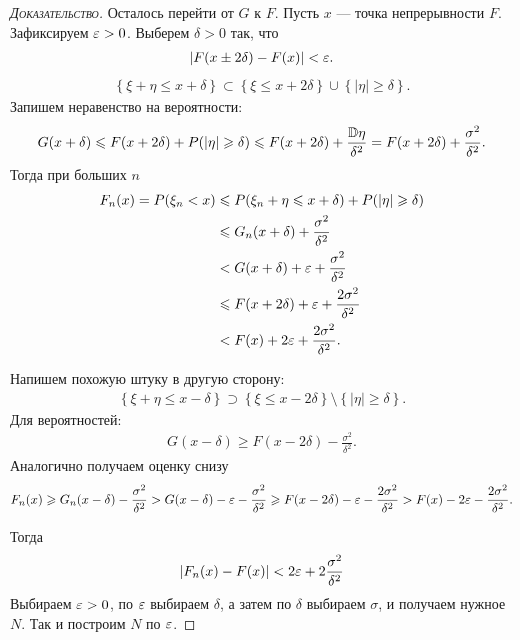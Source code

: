 \documentclass[../main.tex]{subfiles}
\begin{document}
\begin{proof}[\normalfont\textsc{Доказательство}]
 Осталось перейти от $ G $ к $ F $. Пусть $ x $ --- точка непрерывности $ F $. Зафиксируем $ \varepsilon  > 0 $. Выберем $ \delta > 0 $ так, что 
 \begin{align*}
  \left| F(x \pm 2\delta) - F(x) \right| < \varepsilon.
 \end{align*}
 \begin{align*}
  \left\{ \xi+\eta \leqslant x  + \delta \right\} \subset \left\{ \xi \leqslant x + 2\delta \right\} \cup \left\{ \left| \eta \right| \geqslant \delta \right\}.
 \end{align*} Запишем неравенство на вероятности:
 \begin{align*}
	 G(x+\delta) \leqslant F(x+2\delta) + P(\left| \eta \right| \geqslant \delta) \leqslant F(x+2\delta) + \frac{\mathbb D \eta}{\delta^{2}} = F(x + 2\delta) + \frac{\sigma^2}{\delta^2}. 
 \end{align*} 
 Тогда при больших $n$
 \begin{align*}
	 F_n(x) = P(\xi_n < x) &\leqslant P(\xi_n + \eta \leqslant x + \delta) + P(|\eta| \geqslant \delta) \\
												 &\leqslant G_n(x+\delta) + \frac{\sigma^{2}}{\delta^{2}} \\
												 &< G(x+\delta) + \varepsilon + \frac{\sigma^{2}}{\delta^{2}} \\
												 &\leqslant F(x+2\delta) + \varepsilon + \frac{2\sigma^{2}}{\delta^{2}} \\
												 &< F(x) + 2\varepsilon + \frac{2\sigma^{2}}{\delta^{2}}.
 \end{align*}

 Напишем похожую штуку в другую сторону:
 \begin{align*}
  \left\{ \xi +\eta \leqslant x - \delta \right\} \supset \left\{ \xi \leqslant x - 2\delta \right\} \setminus \left\{ \left| \eta \right| \geqslant \delta \right\}.
 \end{align*} Для вероятностей:
 \begin{align*}
  G(x-\delta) \geqslant F(x - 2\delta) - \frac{\sigma^{2}}{\delta^{2}}.
 \end{align*}  Аналогично получаем оценку снизу 
 \begin{align*}
  F_n(x) \geqslant G_n(x - \delta) - \frac{\sigma^{2}}{\delta^{2}} > G(x-\delta) - \varepsilon - \frac{\sigma^{2}}{\delta^{2}} \geqslant F(x - 2\delta) - \varepsilon - \frac{2\sigma^{2}}{\delta^{2}}  > F(x) - 2\varepsilon - \frac{2\sigma^{2}}{\delta^{2}}.
 \end{align*}

 Тогда
 \begin{align*}
  \left| F_n(x) - F(x) \right| < 2\varepsilon + 2 \frac{\sigma^{2}}{\delta^{2}}
 \end{align*} Выбираем $ \varepsilon > 0$, по $ \varepsilon $ выбираем $ \delta $,  а затем по $ \delta $ выбираем $ \sigma $, и получаем нужное $ N $. Так и построим $ N $ по $ \varepsilon $.

\end{proof}
\end{document}
